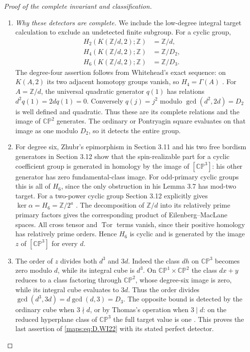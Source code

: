 \begin{proof}[Proof of the complete invariant and classification]
\begin{enumerate}[label=\arabic*.,leftmargin=*]
\item \emph{Why these detectors are complete.}
We include the low-degree integral target calculation to
exclude an undetected finite subgroup. For a cyclic group,
\[
 \begin{aligned}
 H_2(K(\mathbb Z/d,2);\mathbb Z)&=\mathbb Z/d,\\
 H_4(K(\mathbb Z/d,2);\mathbb Z)&=\mathbb Z/D_2,\\
 H_6(K(\mathbb Z/d,2);\mathbb Z)&=\mathbb Z/D_3 .
 \end{aligned}
 \tag{D.WI22}\label{maps:eq:D.WI22}
\]
The degree-four assertion follows from Whitehead's exact
sequence: on $K(A,2)$ its two adjacent homotopy groups
vanish, so $H_4=\Gamma(A)$
\cite[Theorem 1 and Section 2]{mapsWhitehead50}.
For $A=\mathbb Z/d$, the universal quadratic generator
$q(1)$ has relations $d^2q(1)=2dq(1)=0$.
Conversely $q(j)=j^2$ modulo $\gcd(d^2,2d)=D_2$
is well defined and quadratic. Thus these are its complete
relations and the image of $\mathbb {CP}^2$ generates.
The ordinary or Pontryagin square evaluates on that image
as one modulo $D_2$, so it detects the entire group.

\item For degree six, Zhubr's epimorphism in Section 3.11 and
his two free bordism generators in Section 3.12 show that
the spin-realizable part for a cyclic coefficient group
is generated in homology by the image of
$[\mathbb {CP}^3]$: his other generator has zero
fundamental-class image. For odd-primary cyclic groups
this is all of $H_6$, since the only obstruction in his
Lemma 3.7 has mod-two target. For a two-power cyclic
group Section 3.12 explicitly gives
$\ker\alpha=H_6=\mathbb Z/2^a$
\cite[Lemmas 3.7 and 3.11, and Section 3.12,
pp.805--807]{manZhubr75}.
The decomposition of $\mathbb Z/d$ into its relatively
prime primary factors gives the corresponding product
of Eilenberg--MacLane spaces. All cross tensor and
$\operatorname{Tor}$ terms vanish, since their positive
homology has relatively prime orders. Hence $H_6$ is
cyclic and is generated by the image $z$ of
$[\mathbb {CP}^3]$ for every $d$.

\item The order of $z$ divides both $d^3$ and $3d$.
Indeed the class $d h$ on $\mathbb {CP}^3$ becomes zero
modulo $d$, while its integral cube is $d^3$.
On $\mathbb {CP}^1\times\mathbb {CP}^2$ the class
$d x+y$ reduces to a class factoring through
$\mathbb {CP}^2$, whose degree-six image is zero,
while its integral cube evaluates to $3d$.
Thus the order divides
$\gcd(d^3,3d)=d\gcd(d,3)=D_3$.
The opposite bound is detected by the ordinary cube when
$3\nmid d$, or by Thomas's operation when $3\mid d$:
on the reduced hyperplane class of $\mathbb {CP}^3$
the full target value is one
\cite[equation (2.8), p.267]{ffThomas56}.
This proves the last assertion of \eqref{maps:eq:D.WI22} with its
stated perfect detector.


\end{enumerate}
\end{proof}
